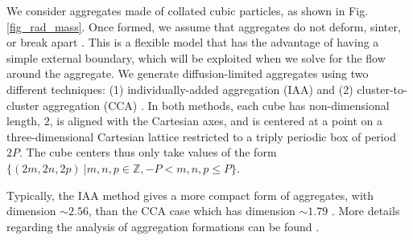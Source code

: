 We consider aggregates made of collated cubic particles, as shown in Fig. \ref{fig_rad_mass}. Once formed, we assume that aggregates do not deform, sinter, or break apart \cite{eggersdorfer_multiparticle_2011}.
This is a flexible model that has the advantage of having a
simple external boundary, which will be exploited when we solve for the flow around the aggregate. We generate diffusion-limited aggregates using two different techniques: (1)
individually-added aggregation (IAA) and (2) cluster-to-cluster aggregation (CCA) \cite{witten_tenuous_1986,kolb_anisotropic_1987}. In both methods, each cube has non-dimensional length, $2$, is aligned with the Cartesian axes, and  is centered at a point on a three-dimensional Cartesian lattice restricted to a triply periodic box of period $2P$. The cube centers thus only take values of the form $\{ (2m,2n,2p) \  | m,n,p \in \mathbb{Z}, -P<m,n,p\leq P \}$. 

Typically, the IAA method gives a more compact form of aggregates, with dimension $\sim 2.56$, than the CCA case which has dimension $\sim 1.79$ \cite{witten_diffusion-limited_1981, kaye_random_2008}. More details regarding the analysis of aggregation formations can be found \cite{yoo_hydrodynamic_2020}.


